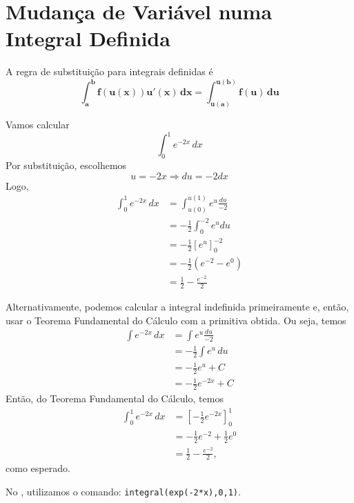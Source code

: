 \cleardoublepage\documentclass[../main.tex]{subfiles}
\begin{document}
\section{Mudança de Variável numa Integral Definida}
A regra de substituição para integrais definidas é
\begin{equation}
  \boldsymbol{\int_a^b f(u(x))u'(x)\,dx = \int_{u(a)}^{u(b)} f(u)\,du}
\end{equation}

\begin{ex}
  Vamos calcular
  \begin{equation*}
    \int_0^1 e^{-2x}\,dx
  \end{equation*}
  Por substituição, escolhemos
  \begin{equation*}
    u = -2x \Rightarrow du = -2dx
  \end{equation*}
  Logo,
  \begin{align*}
    \int_0^1 e^{-2x}\,dx &= \int_{u(0)}^{u(1)} e^{u}\frac{du}{-2} \\
                         &= -\frac{1}{2}\int_{0}^{-2} e^udu \\
                         &= -\frac{1}{2}\left[e^u\right]_0^{-2} \\
                         &= -\frac{1}{2}\left(e^{-2} - e^0\right) \\
                         &= \frac{1}{2} - \frac{e^{-2}}{2}
  \end{align*}

  Alternativamente, podemos calcular a integral indefinida primeiramente e, então, usar o Teorema Fundamental do Cálculo com a primitiva obtida. Ou seja, temos
  \begin{align*}
    \int e^{-2x}\,dx &= \int e^u\frac{du}{-2} \\
                     &= -\frac{1}{2}\int e^u\,du \\
                     &= -\frac{1}{2}e^u + C \\
                     &= -\frac{1}{2}e^{-2x} + C
  \end{align*}
  Então, do Teorema Fundamental do Cálculo, temos
  \begin{align*}
    \int_0^1 e^{-2x}\,dx &= \left[-\frac{1}{2}e^{-2x}\right]_0^1 \\
                         &= -\frac{1}{2}e^{-2} + \frac{1}{2}e^{0} \\
                         &= \frac{1}{2} - \frac{e^{-2}}{2},
  \end{align*}
  como esperado.


No \geogebra, utilizamos o comando: \verb|integral(exp(-2*x),0,1)|.
\end{ex}
\end{document}

